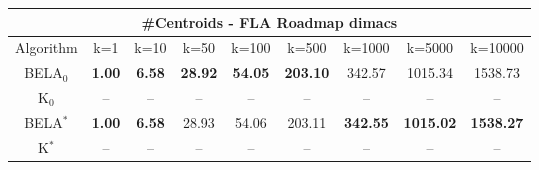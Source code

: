 \begin{tabular}{c|cccccccc}\toprule
\multicolumn{9}{c}{#Centroids - FLA Roadmap dimacs}\\ \midrule
Algorithm & k=1 & k=10 & k=50 & k=100 & k=500 & k=1000 & k=5000 & k=10000 \\ \midrule
BELA$_0$ & \textbf{1.00} & \textbf{6.58} & \textbf{28.92} & \textbf{54.05} & \textbf{203.10} & 342.57 & 1015.34 & 1538.73 \\
K$_0$ & -- & -- & -- & -- & -- & -- & -- & -- \\
BELA$^*$ & \textbf{1.00} & \textbf{6.58} & 28.93 & 54.06 & 203.11 & \textbf{342.55} & \textbf{1015.02} & \textbf{1538.27} \\
K$^*$ & -- & -- & -- & -- & -- & -- & -- & -- \\ \bottomrule 
\end{tabular}
